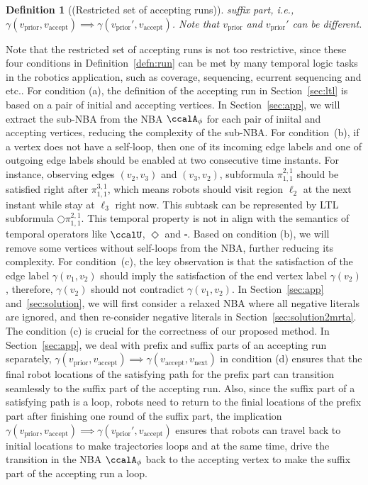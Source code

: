\documentclass[Afour,sageh,times]{sagej}
\newtheorem{defn}[thm]{Definition}
\newcommand{\autop}{\ccalA_{\phi}}
\newcommand{\vertex}[1]{v_{\text{#1}}}
\renewcommand{\ap}[3]{\mathcal{\pi}_{{#1},{#2}}^{#3}}
\begin{document}
\begin{defn}[(Restricted set of accepting runs)]
suffix part, i.e., $\gamma(\vertex{prior}, \vertex{accept}) \implies  \gamma(\vertex{prior}', \vertex{accept})$. Note that $\vertex{prior}$ and $\vertex{prior}'$ can be different.
 \end{defn}


Note that the restricted set of accepting runs is not too restrictive, since these four conditions in Definition~\ref{defn:run} can be met by many temporal logic tasks in the robotics application, such as coverage, sequencing, ecurrent sequencing and etc.. For condition (a), the definition of the accepting run in Section~\ref{sec:ltl} is based on a pair of initial and accepting vertices. In Section~\ref{sec:app}, we will extract the sub-NBA from the NBA $\autop$ for each pair of iniital and accepting vertices, reducing the complexity of the sub-NBA. For condition~{(b)}, if a vertex does not have a self-loop, then one of its incoming edge labels  and one of outgoing edge labels  should be enabled at two consecutive time instants. For instance, observing edges $(v_2, v_3)$ and $(v_3, v_2)$, subformula $\ap{1}{1}{2,1}$ should be satisfied right after $\ap{1}{1}{3,1}$, which means robots should visit region $\ell_2$ at the next instant while stay at $\ell_3$ right now. This subtask can be represented by LTL subformula $\bigcirc \ap{1}{1}{2,1}$. This temporal property is not in align with the semantics of temporal operators like $\ccalU$, $\Diamond$ and $\square$. Based on condition (b), we will remove some vertices without self-loops from the NBA, further reducing its complexity. For condition~{(c)}, the key observation is that the satisfaction of the edge label $\gamma(v_1, v_2)$ should imply the satisfaction of the end vertex label $\gamma(v_2)$, therefore, $\gamma(v_2)$ should not contradict $\gamma(v_1, v_2)$. In Section~\ref{sec:app} and~\ref{sec:solution}, we will first consider a relaxed NBA where all negative literals are ignored, and then re-consider negative literals in Section~\ref{sec:solution2mrta}. The condition (c) is crucial for the correctness of our proposed method. In Section~\ref{sec:app}, we deal with prefix and suffix parts of an accepting run separately, $\gamma(\vertex{prior}, \vertex{accept}) \implies  \gamma(\vertex{accept}, \vertex{next})$ in condition (d) ensures that the final robot locations of the satisfying path for  the prefix part can transition seamlessly to the suffix part of the accepting run. Also, since the suffix part of a satisfying path is a loop, robots need to return to the finial locations of the prefix part after finishing one round of the suffix part, the implication $\gamma(\vertex{prior}, \vertex{accept}) \implies  \gamma(\vertex{prior}', \vertex{accept})$ ensures that robots can travel back to initial locations to make trajectories loops and at the same time, drive the transition in the NBA $\autop$ back to the accepting vertex to make the suffix part of the accepting run  a loop.
\end{document}
